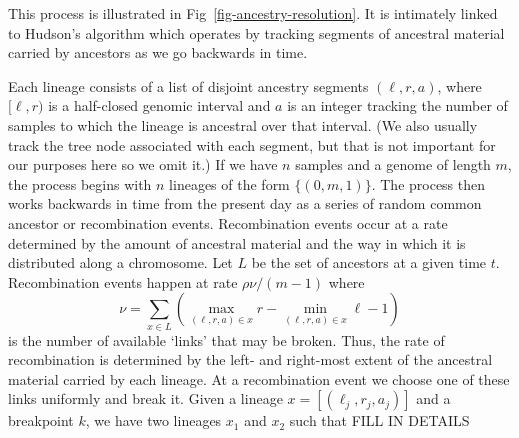 \documentclass{article}
\begin{document}
This process is illustrated in Fig~\ref{fig-ancestry-resolution}. It is intimately linked to 
Hudson's algorithm which operates by
tracking segments of ancestral material carried by ancestors as
we go backwards in time. 

%
Each lineage consists of a list of
disjoint ancestry segments $(\ell, r, a)$, where
$[\ell, r)$ is a half-closed genomic interval and $a$ is an integer
tracking the number of samples to which the lineage is ancestral over that interval.
(We also usually track the tree node associated with each segment, but
that is not important for our purposes here so we omit it.)
If we have $n$ samples and a genome of length $m$, the process begins with $n$ lineages
of the form $\{(0, m, 1)\}$. The process then works backwards in time from
the present day as a series of random common ancestor or recombination events.
Recombination events occur at a rate determined by the amount of ancestral material and
the way in which it is distributed along a chromosome.
Let $L$ be the set of ancestors at a given time $t$. Recombination events
happen at rate $\rho \nu / (m - 1)$ where
\[
\nu = \sum_{x \in L}\left( \max_{(\ell, r, a) \in x}r
    - \min_{(\ell, r, a) \in x}\ell - 1 \right)
\]
is the number of available `links' that may be broken. Thus, the rate of
recombination is determined by the left- and right-most extent of the
ancestral material carried by each lineage. At a recombination
event we choose one of these links uniformly and break it. Given a lineage
$x = [(\ell_j, r_j, a_j)]$ and a breakpoint $k$, we have two lineages
$x_1$ and $x_2$ such that FILL IN DETAILS
\end{document}
